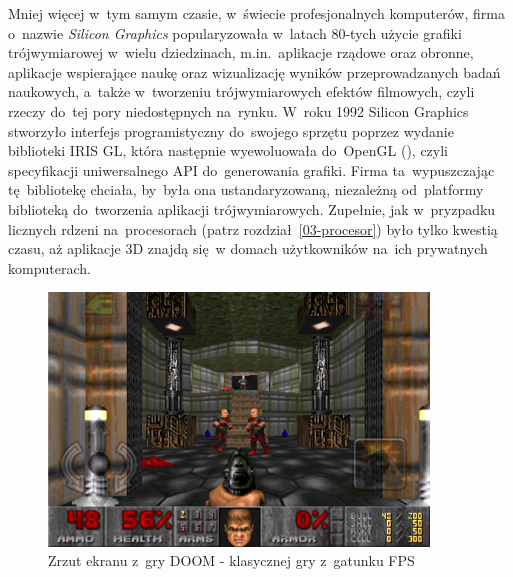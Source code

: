 Mniej więcej w~tym samym czasie, w~świecie profesjonalnych komputerów, firma o~nazwie \emph{Silicon Graphics} popularyzowała w~latach 80-tych użycie grafiki trójwymiarowej w~wielu dziedzinach, m.in.~aplikacje rządowe oraz obronne, aplikacje wspierające naukę oraz wizualizację wyników przeprowadzanych badań naukowych, a~także w~tworzeniu trójwymiarowych efektów filmowych, czyli rzeczy do~tej pory niedostępnych na~rynku. W~roku 1992 Silicon Graphics stworzyło interfejs programistyczny do~swojego sprzętu poprzez wydanie biblioteki IRIS GL, która następnie wyewoluowała do~OpenGL (), czyli specyfikacji uniwersalnego API do~generowania grafiki. Firma ta~wypuszczając tę~bibliotekę chciała, by~była ona ustandaryzowaną, niezależną od~platformy biblioteką do~tworzenia aplikacji trójwymiarowych. Zupełnie, jak w~pryzpadku licznych rdzeni na~procesorach (patrz rozdział~\ref{03-procesor}) było tylko kwestią czasu, aż aplikacje 3D znajdą się~w domach użytkowników na~ich prywatnych komputerach.

\begin{figure}[ht]
\centering\includegraphics[width=0.9\textwidth]{figures/03/doom.png}
\caption{Zrzut ekranu z~gry DOOM - klasycznej gry z~gatunku FPS}\label{rys:doom}
\end{figure}

